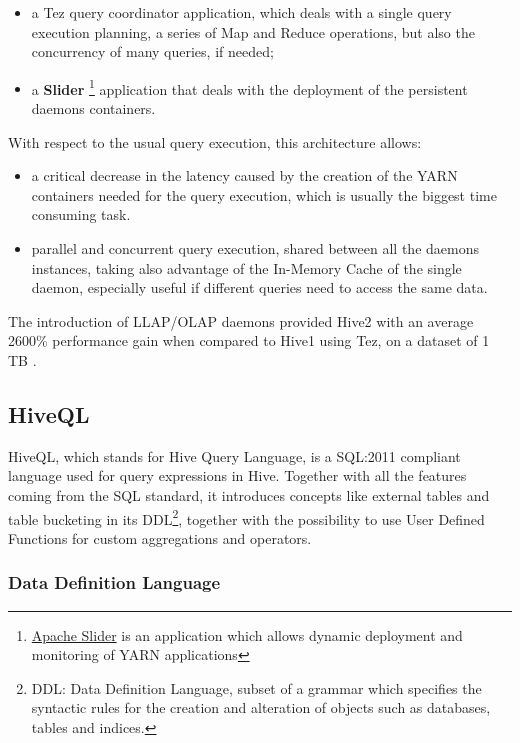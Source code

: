 \begin{itemize}
    \item a Tez query coordinator application, which deals with a single query execution planning, a series of Map and Reduce operations, but also the concurrency of many queries, if needed;
    \item a \textbf{Slider} \footnote{\href{https://slider.incubator.apache.org/}{Apache Slider} is an application which allows dynamic deployment and monitoring of YARN applications} application that deals with the deployment of the persistent daemons containers.
\end{itemize}

With respect to the usual query execution, this architecture allows:

\begin{itemize} 
	\item a critical decrease in the latency caused by the creation of the YARN containers needed for the query execution, which is usually the biggest time consuming task.
	\item parallel and concurrent query execution, shared between all the daemons instances, taking also advantage of the In-Memory Cache of the single daemon, especially useful if different queries need to access the same data.
\end{itemize}

The introduction of LLAP/OLAP daemons provided Hive2 with an average 2600\% performance gain when compared to Hive1 using Tez, on a dataset of 1 TB \cite{hive2_on_tez}.

\subsection{HiveQL}

HiveQL, which stands for Hive Query Language, is a SQL:2011 compliant language used for query expressions in Hive. Together with all the features coming from the SQL standard, it introduces concepts like external tables and table bucketing in its DDL\footnote{DDL: Data Definition Language, subset of a grammar which specifies the syntactic rules for the creation and alteration of objects such as databases, tables and indices.}, together with the possibility to use User Defined Functions for custom aggregations and operators.

\subsubsection{Data Definition Language}

